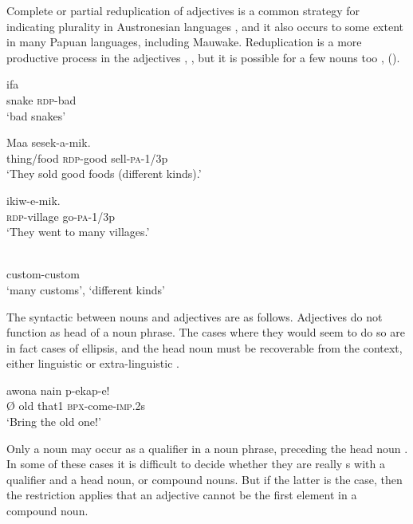 Complete or partial reduplication of adjectives is a common strategy for indicating plurality in Austronesian languages \citep[62]{Wurm1982}, and it also occurs to some extent in many Papuan languages, including Mauwake. Reduplication is a more productive process in the adjectives , , but it is possible for a few nouns too ,  (). 

\ea%
\label{ex:3:x12}
\gll ifa  \\
snake \textsc{rdp}-bad\\
\glt`bad snakes'
\z

\ea%
\label{ex:3:x481}
\gll Maa  sesek-a-mik. \\
thing/food \textsc{rdp}-good sell-\textsc{pa}-1/3p\\
\glt`They sold good foods (different kinds).'
\z

\ea%
\label{ex:3:x13}
\gll {} ikiw-e-mik. \\
\textsc{rdp}-village go-\textsc{pa}-1/3p\\
\glt`They went to many villages.'
\z

\ea%
\label{ex:3:x1859}
\gll {} \\
custom-custom\\
\glt`many customs', `different kinds'
\z

The syntactic  between nouns and adjectives are as follows. Adjectives do not function as  head of a noun phrase. The cases where they would seem to do so are in fact cases of ellipsis, and the head noun must be recoverable from the context, either linguistic or extra-linguistic . 

\ea%
\label{ex:3:x14}
\gll {\O} awona nain p-ekap-e! \\
{\O} old that1 \textsc{bpx}-come-\textsc{imp}.2s\\
\glt`Bring the old one!'
\z

Only a noun may occur as a qualifier in a noun phrase, preceding the head noun . In some of these cases it is difficult to decide whether they are really s with a qualifier and a head noun, or compound nouns. But if the latter is the case, then the restriction applies that an adjective cannot be the first element in a compound noun.

